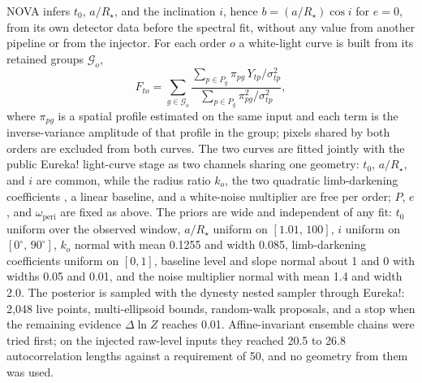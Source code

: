 
NOVA infers $t_0$, $a/R_\star$, and the inclination $i$, hence
$b=(a/R_\star)\cos i$ for $e=0$, from its own detector data before the
spectral fit, without any value from another pipeline or from the
injector. For each order $o$ a white-light curve is built from its
retained groups $\mathcal{G}_o$,
\begin{equation}
 F_{to}=\sum_{g\in\mathcal{G}_o}
 \frac{\sum_{p\in P_g}\pi_{pg}\,Y_{tp}/\sigma_{tp}^2}
      {\sum_{p\in P_g}\pi_{pg}^2/\sigma_{tp}^2},
 \label{eq:white-curve}
\end{equation}
where $\pi_{pg}$ is a spatial profile estimated on the same input and
each term is the inverse-variance amplitude of that profile in the
group; pixels shared by both orders are excluded from both curves. The
two curves are fitted jointly with the public Eureka! light-curve stage
\citep{BellEtAl2022} as two channels sharing one geometry: $t_0$,
$a/R_\star$, and $i$ are common, while the radius ratio $k_o$, the two
quadratic limb-darkening coefficients \citep{MandelAgol2002}, a linear
baseline, and a white-noise multiplier are free per order; $P$, $e$, and
$\omega_{\mathrm{peri}}$ are fixed as above. The priors are wide and
independent of any fit: $t_0$ uniform over the observed window,
$a/R_\star$ uniform on $[1.01,\,100]$, $i$ uniform on
$[0^\circ,\,90^\circ]$, $k_o$ normal with mean 0.1255 and width 0.085,
limb-darkening coefficients uniform on $[0,1]$, baseline level and slope
normal about 1 and 0 with widths 0.05 and 0.01, and the noise multiplier
normal with mean 1.4 and width 2.0. The posterior is sampled with the
dynesty nested sampler through Eureka!: 2{,}048 live points,
multi-ellipsoid bounds, random-walk proposals, and a stop when the
remaining evidence $\Delta\ln Z$ reaches 0.01.
Affine-invariant ensemble chains were tried first; on the injected
raw-level inputs they reached 20.5 to 26.8 autocorrelation lengths
against a requirement of 50, and no geometry from them was used.

